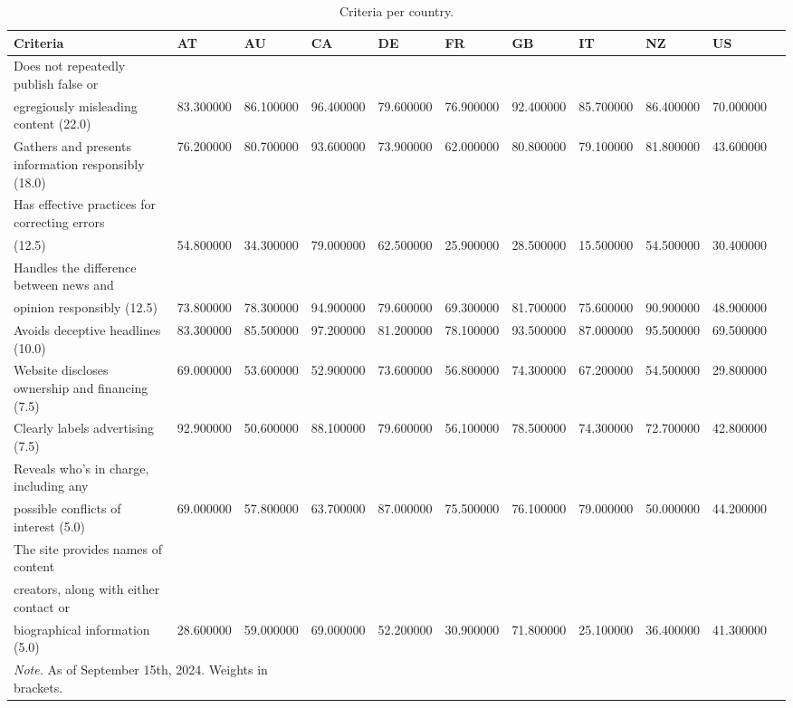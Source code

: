 \begin{table}[H]
\caption{Criteria per country.}
\label{tab:criteria_country}
\begin{tabularx}{\textwidth}{l X X X X X X X X X X}
\toprule
Criteria & AT & AU & CA & DE & FR & GB & IT & NZ & US \\
\midrule
Does not repeatedly publish false or \\ egregiously misleading content (22.0) & 83.300000 & 86.100000 & 96.400000 & 79.600000 & 76.900000 & 92.400000 & 85.700000 & 86.400000 & 70.000000 \\
Gathers and presents information responsibly (18.0) & 76.200000 & 80.700000 & 93.600000 & 73.900000 & 62.000000 & 80.800000 & 79.100000 & 81.800000 & 43.600000 \\
Has effective practices for correcting errors \\ (12.5) & 54.800000 & 34.300000 & 79.000000 & 62.500000 & 25.900000 & 28.500000 & 15.500000 & 54.500000 & 30.400000 \\
Handles the difference between news and \\ opinion responsibly (12.5) & 73.800000 & 78.300000 & 94.900000 & 79.600000 & 69.300000 & 81.700000 & 75.600000 & 90.900000 & 48.900000 \\
Avoids deceptive headlines (10.0) & 83.300000 & 85.500000 & 97.200000 & 81.200000 & 78.100000 & 93.500000 & 87.000000 & 95.500000 & 69.500000 \\
Website discloses ownership and financing (7.5) & 69.000000 & 53.600000 & 52.900000 & 73.600000 & 56.800000 & 74.300000 & 67.200000 & 54.500000 & 29.800000 \\
Clearly labels advertising (7.5) & 92.900000 & 50.600000 & 88.100000 & 79.600000 & 56.100000 & 78.500000 & 74.300000 & 72.700000 & 42.800000 \\
Reveals who's in charge, including any \\ possible conflicts of interest (5.0) & 69.000000 & 57.800000 & 63.700000 & 87.000000 & 75.500000 & 76.100000 & 79.000000 & 50.000000 & 44.200000 \\
The site provides names of content \\ creators, along with either contact or \\ biographical information (5.0) & 28.600000 & 59.000000 & 69.000000 & 52.200000 & 30.900000 & 71.800000 & 25.100000 & 36.400000 & 41.300000 \\
\bottomrule
\multicolumn{3}{l}{\textit{Note.} As of September 15th, 2024. Weights in brackets.}
\end{tabularx}
\end{table}
